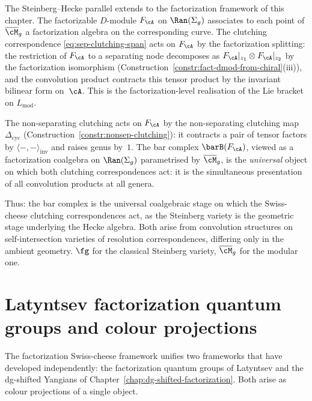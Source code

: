 \begin{remark}
\label{rem:steinberg-factorization}
The Steinberg--Hecke parallel extends to the
factorization framework of this chapter. The factorizable
$D$-module $F_\cA$ on $\Ran(\Sigma_g)$ associates to each point
of $\Mbar_g$ a factorization algebra on the corresponding curve.
The clutching correspondence \eqref{eq:sep-clutching-span} acts on
$F_\cA$ by the factorization splitting: the restriction of $F_\cA$
to a separating node decomposes as $F_\cA|_{z_1} \otimes F_\cA|_{z_2}$
by the factorization isomorphism
(Construction~\ref{constr:fact-dmod-from-chiral}(iii)), and the
convolution product contracts this tensor product by the invariant
bilinear form on~$\cA$. This is the factorization-level
realisation of the Lie bracket on $L_{\mathrm{mod}}$.

The non-separating clutching acts on $F_\cA$ by the non-separating
clutching map $\Delta_{\mathrm{cyc}}$
(Construction~\ref{constr:nonsep-clutching}): it contracts a pair
of tensor factors by $\langle{-},{-}\rangle_{\mathrm{inv}}$ and
raises genus by~$1$. The bar complex $\barB(F_\cA)$, viewed as a
factorization coalgebra on $\Ran(\Sigma_g)$ parametrised by $\Mbar_g$,
is the \emph{universal} object on which both clutching correspondences
act: it is the simultaneous presentation of all convolution products
at all genera.

Thus: the bar complex is the universal coalgebraic stage on which the
Swiss-cheese clutching correspondences act, as the Steinberg variety
is the geometric stage underlying the Hecke algebra. Both arise from
convolution structures on self-intersection varieties of resolution
correspondences, differing only in the ambient geometry.
$\fg$ for the classical Steinberg variety, $\Mbar_g$ for the
modular one.
\end{remark}


\section{Latyntsev factorization quantum groups and colour projections}
\label{sec:latyntsev-colour-projections}

The factorization Swiss-cheese framework unifies two frameworks
that have developed independently: the factorization quantum groups
of Latyntsev \cite{Latyntsev23} and the dg-shifted Yangians of
Chapter~\ref{chap:dg-shifted-factorization}. Both arise as colour
projections of a single object.

